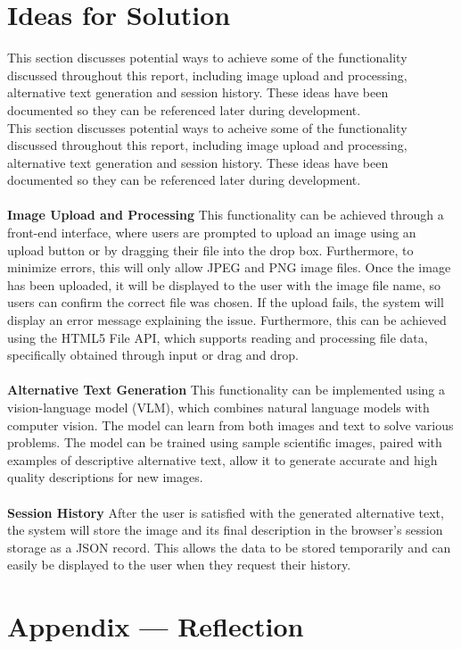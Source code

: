 \documentclass[12pt]{article}
\begin{document}
\section{Ideas for Solution}
This section discusses potential ways to achieve some of the functionality discussed throughout this report, 
including image upload and processing, alternative text generation and session history. 
These ideas have been documented so they can be referenced later during development.\\
This section discusses potential ways to acheive some of the
functionality discussed throughout this report,
including image upload and processing, alternative text generation
and session history.
These ideas have been documented so they can be referenced later
during development.\\
\\
\textbf{Image Upload and Processing}
This functionality can be achieved through a front-end interface,
where users are prompted to upload an image using an upload button or
by dragging their file into the drop box. Furthermore, to minimize
errors, this will only allow JPEG and PNG image files.
Once the image has been uploaded, it will be displayed to the user
with the image file name, so users can confirm the correct file was chosen.
If the upload fails, the system will display an error message
explaining the issue. Furthermore, this can be achieved using the
HTML5 File API, which supports reading and processing file data,
specifically obtained through input or drag and drop. \\
\\
\textbf{Alternative Text Generation}
This functionality can be implemented using a vision-language model
(VLM), which combines natural language models with computer vision.
The model can learn from both images and text to solve various
problems. The model can be trained using sample scientific images,
paired with examples of descriptive alternative text, allow it to
generate accurate and high quality descriptions for new images.\\
\\
\textbf{Session History}
After the user is satisfied with the generated alternative text, the
system will store the image and its final description in the
browser's session storage as a JSON record. This allows the data to
be stored temporarily and can easily be displayed to the user when
they request their history. \\
\section*{Appendix --- Reflection}
\end{document}
